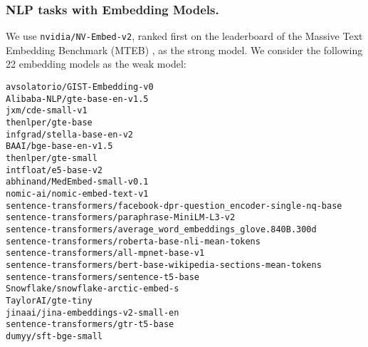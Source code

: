 \subsubsection{NLP tasks with Embedding Models.}


We use \texttt{nvidia/NV-Embed-v2}, ranked first on the leaderboard of the Massive Text Embedding Benchmark (MTEB) \cite{muennighoff2022mteb}, as the strong model. We consider the following 22 embedding models as the weak model: 
\begin{tabbing}
\texttt{avsolatorio/GIST-Embedding-v0} \\
\texttt{Alibaba-NLP/gte-base-en-v1.5} \\
\texttt{jxm/cde-small-v1} \\
\texttt{thenlper/gte-base} \\
\texttt{infgrad/stella-base-en-v2} \\
\texttt{BAAI/bge-base-en-v1.5} \\
\texttt{thenlper/gte-small} \\
\texttt{intfloat/e5-base-v2} \\
\texttt{abhinand/MedEmbed-small-v0.1} \\
\texttt{nomic-ai/nomic-embed-text-v1} \\
\texttt{sentence-transformers/facebook-dpr-question\_encoder-single-nq-base} \\
\texttt{sentence-transformers/paraphrase-MiniLM-L3-v2} \\
\texttt{sentence-transformers/average\_word\_embeddings\_glove.840B.300d} \\
\texttt{sentence-transformers/roberta-base-nli-mean-tokens} \\
\texttt{sentence-transformers/all-mpnet-base-v1} \\
\texttt{sentence-transformers/bert-base-wikipedia-sections-mean-tokens} \\
\texttt{sentence-transformers/sentence-t5-base} \\
\texttt{Snowflake/snowflake-arctic-embed-s} \\
\texttt{TaylorAI/gte-tiny} \\
\texttt{jinaai/jina-embeddings-v2-small-en} \\
\texttt{sentence-transformers/gtr-t5-base} \\
\texttt{dumyy/sft-bge-small} \\
\end{tabbing}

